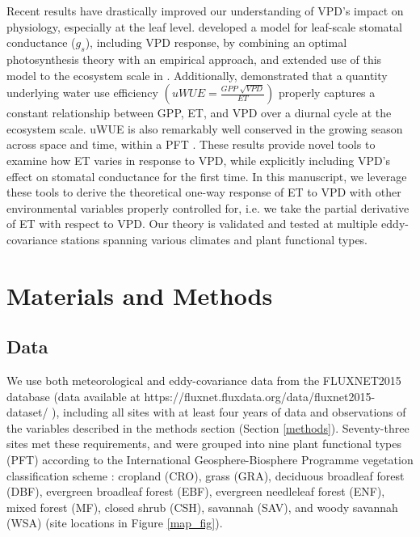 \documentclass[draft,linenumbers]{agujournal}
\begin{document}
Recent results have drastically improved our understanding of VPD's
impact on physiology, especially at the leaf
level. \citet{MEDLYN_2011} developed a model for leaf-scale stomatal
conductance ($g_s$), including VPD response, by combining an optimal
photosynthesis theory \citep{Farquhar_1980, Katul_2010} with an
empirical approach, and extended use of this model to the ecosystem
scale in \citet{Medlyn_2017}. Additionally, \citet{Zhou_2014}
demonstrated that a quantity underlying water use efficiency
$\left(uWUE = \frac{GPP\; \sqrt{VPD}}{ET}\right)$ properly captures a
constant relationship between GPP, ET, and VPD over a diurnal cycle at
the ecosystem scale. uWUE is also remarkably well conserved in the
growing season across space and time, within a PFT
\citep{Zhou_2015}. These results provide novel tools to examine how ET
varies in response to VPD, while explicitly including VPD's effect on
stomatal conductance for the first time. In this manuscript, we
leverage these tools to derive the theoretical one-way response of ET
to VPD with other environmental variables properly controlled for,
i.e. we take the partial derivative of ET with respect to VPD. Our
theory is validated and tested at multiple eddy-covariance stations
spanning various climates and plant functional types.

\section{Materials and Methods}
\subsection{Data}
\label{data}
We use both meteorological and eddy-covariance data from the
FLUXNET2015 database (data available at \sloppy
https://fluxnet.fluxdata.org/data/fluxnet2015-dataset/ \sloppy),
including all sites with at least four years of data and observations
of the variables described in the methods section (Section
\ref{methods}). Seventy-three sites met these requirements, and were
grouped into nine plant functional types (PFT) according to the
International Geosphere-Biosphere Programme vegetation classification
scheme \citep{Loveland_1999}: cropland (CRO), grass (GRA), deciduous
broadleaf forest (DBF), evergreen broadleaf forest (EBF), evergreen
needleleaf forest (ENF), mixed forest (MF), closed shrub (CSH),
savannah (SAV), and woody savannah (WSA) (site locations in Figure
\ref{map_fig}).
\end{document}
